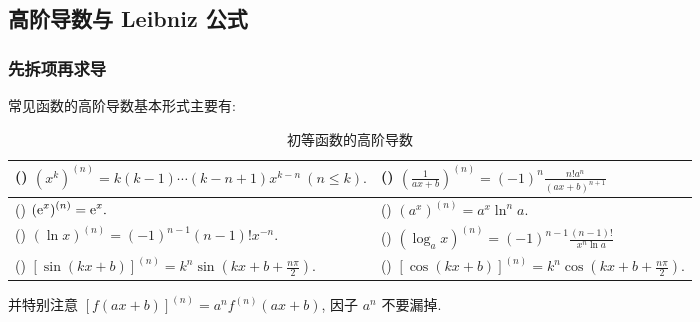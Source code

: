\subsection{高阶导数与 Leibniz 公式}

\subsubsection{先拆项再求导}


常见函数的高阶导数基本形式主要有:

\setcounter{magicrownumbers}{0}
\begin{table}[H]
    \centering
    \caption{初等函数的高阶导数}
    \begin{tabular}{l l}
        (\rownumber{}) $\displaystyle (x^k)^{(n)}=k(k-1)\cdots(k-n+1)x^{k-n}~  (n\leqslant k).$    & (\rownumber{}) $\displaystyle \left(\frac{1}{ax+b}\right)^{(n)}=(-1)^n\frac{n!a^n}{(ax+b)^{n+1}}$ \\
        \midrule
        (\rownumber{}) $\displaystyle(\mathrm{e} ^x)^{(n)}=\mathrm{e} ^x.$                                         & (\rownumber{}) $\displaystyle (a^x)^{(n)}=a^x\ln^n a.$                                            \\
        (\rownumber{}) $\displaystyle(\ln x)^{(n)}=(-1)^{n-1}(n-1)!x^{-n}.$                        & (\rownumber{}) $\displaystyle(\log_ax)^{(n)}=(-1)^{n-1}\frac{(n-1)!}{x^n\ln a}$                   \\
        \midrule
        (\rownumber{}) $\displaystyle[\sin (kx+b)]^{(n)}=k^n\sin\left(kx+b+\frac{n\pi}{2}\right).$ & (\rownumber{}) $\displaystyle[\cos (kx+b)]^{(n)}=k^n\cos\left(kx+b+\frac{n\pi}{2}\right).$
    \end{tabular}
\end{table}
并特别注意 $[f(ax+b)]^{(n)}=a^nf^{(n)}(ax+b)$, 因子 $a^n$ 不要漏掉.

